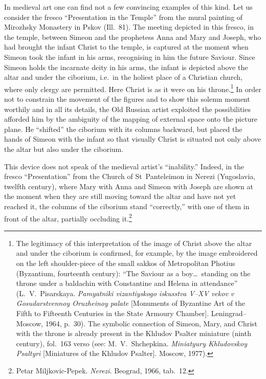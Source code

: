 In medieval art one can find not a few convincing examples of this kind.  Let us consider
the fresco ``Presentation in the Temple'' from the mural painting of Mirozhsky Monastery
in Pskov (Ill.~81).  The meeting depicted in this fresco, in the temple, between Simeon
and the prophetess Anna and Mary and Joseph, who had brought the infant Christ to the
temple, is captured at the moment when Simeon took the infant in his arms, recognising
in him the future Saviour.  Since Simeon holds the incarnate deity in his arms, the
infant is depicted above the altar and under the ciborium, i.e.\ in the holiest place of
a Christian church, where only clergy are permitted.  Here Christ is as it were on his
throne.\footnote{The legitimacy of this interpretation of the image of Christ above the
  altar and under the ciborium is confirmed, for example, by the image embroidered on the
  left shoulder-piece of the small sakkos of Metropolitan Photius (Byzantium, fourteenth
  century): ``The Saviour as a boy\ldots\ standing on the throne under a baldachin with
  Constantine and Helena in attendance'' (L.~V.~Pisarskaya.  \emph{Pamyatniki
  vizantiyskogo iskusstva V--XV vekov v Gosudarstvennoy Oruzheinoy palate} [Monuments
  of Byzantine Art of the Fifth to Fifteenth Centuries in the State Armoury Chamber].
  Leningrad--Moscow, 1964, p.~30).  The symbolic connection of Simeon, Mary, and Christ
  with the throne is already present in the Khludov Psalter miniature (ninth century),
  fol.~163 verso (see: M.~V.~Shchepkina.  \emph{Miniatyury Khludovskoy Psaltyri}
  [Miniatures of the Khludov Psalter].  Moscow, 1977).}  In order not to constrain the
movement of the figures and to show this solemn moment worthily and in all its details,
the Old Russian artist exploited the possibilities afforded him by the ambiguity of the
mapping of external space onto the picture plane.  He ``shifted'' the ciborium with its
columns backward, but placed the hands of Simeon with the infant so that visually Christ
is situated not only above the altar but also under the ciborium.

This device does not speak of the medieval artist's ``inability.''  Indeed, in the fresco
``Presentation'' from the Church of St~Panteleimon in Nerezi (Yugoslavia, twelfth
century), where Mary with Anna and Simeon with Joseph are shown at the moment when they
are still moving toward the altar and have not yet reached it, the columns of the ciborium
stand ``correctly,'' with one of them in front of the altar, partially occluding
it.\footnote{Petar Miljkovic-Pepek.  \emph{Nerezi}.  Beograd, 1966, tab.~12.}

